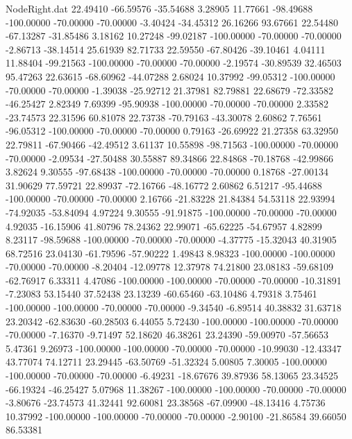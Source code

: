 \begin{filecontents}{NodeRight.dat}
  22.49410  -66.59576  -35.54688     3.28905   11.77661  -98.49688 -100.00000  -70.00000  -70.00000   -3.40424  -34.45312   26.16266   93.67661
  22.54480  -67.13287  -31.85486     3.18162   10.27248  -99.02187 -100.00000  -70.00000  -70.00000   -2.86713  -38.14514   25.61939   82.71733
  22.59550  -67.80426  -39.10461     4.04111   11.88404  -99.21563 -100.00000  -70.00000  -70.00000   -2.19574  -30.89539   32.46503   95.47263
  22.63615  -68.60962  -44.07288     2.68024   10.37992  -99.05312 -100.00000  -70.00000  -70.00000   -1.39038  -25.92712   21.37981   82.79881
  22.68679  -72.33582  -46.25427     2.82349    7.69399  -95.90938 -100.00000  -70.00000  -70.00000    2.33582  -23.74573   22.31596   60.81078
  22.73738  -70.79163  -43.30078     2.60862    7.76561  -96.05312 -100.00000  -70.00000  -70.00000    0.79163  -26.69922   21.27358   63.32950
  22.79811  -67.90466  -42.49512     3.61137   10.55898  -98.71563 -100.00000  -70.00000  -70.00000   -2.09534  -27.50488   30.55887   89.34866
  22.84868  -70.18768  -42.99866     3.82624    9.30555  -97.68438 -100.00000  -70.00000  -70.00000    0.18768  -27.00134   31.90629   77.59721
  22.89937  -72.16766  -48.16772     2.60862    6.51217  -95.44688 -100.00000  -70.00000  -70.00000    2.16766  -21.83228   21.84384   54.53118
  22.93994  -74.92035  -53.84094     4.97224    9.30555  -91.91875 -100.00000  -70.00000  -70.00000    4.92035  -16.15906   41.80796   78.24362
  22.99071  -65.62225  -54.67957     4.82899    8.23117  -98.59688 -100.00000  -70.00000  -70.00000   -4.37775  -15.32043   40.31905   68.72516
  23.04130  -61.79596  -57.90222     1.49843    8.98323 -100.00000 -100.00000  -70.00000  -70.00000   -8.20404  -12.09778   12.37978   74.21800
  23.08183  -59.68109  -62.76917     6.33311    4.47086 -100.00000 -100.00000  -70.00000  -70.00000  -10.31891   -7.23083   53.15440   37.52438
  23.13239  -60.65460  -63.10486     4.79318    3.75461 -100.00000 -100.00000  -70.00000  -70.00000   -9.34540   -6.89514   40.38832   31.63718
  23.20342  -62.83630  -60.28503     6.44055    5.72430 -100.00000 -100.00000  -70.00000  -70.00000   -7.16370   -9.71497   52.18620   46.38261
  23.24390  -59.00970  -57.56653     5.47361    9.26973 -100.00000 -100.00000  -70.00000  -70.00000  -10.99030  -12.43347   43.77074   74.12711
  23.29445  -63.50769  -51.32324     5.00805    7.30005 -100.00000 -100.00000  -70.00000  -70.00000   -6.49231  -18.67676   39.87936   58.13065
  23.34525  -66.19324  -46.25427     5.07968   11.38267 -100.00000 -100.00000  -70.00000  -70.00000   -3.80676  -23.74573   41.32441   92.60081
  23.38568  -67.09900  -48.13416     4.75736   10.37992 -100.00000 -100.00000  -70.00000  -70.00000   -2.90100  -21.86584   39.66050   86.53381

\end{filecontents}
